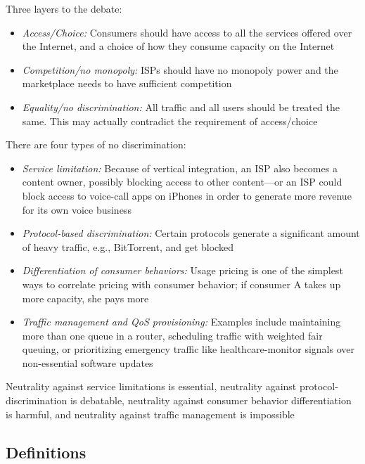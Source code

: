 \documentclass{article}
\begin{document}
Three layers to the debate:
\begin{itemize}
\item \textit{Access/Choice:} Consumers should have access to all the services offered over the Internet, and a choice of how they consume capacity on the Internet
\item \textit{Competition/no monopoly:} ISPs should have no monopoly power and the marketplace needs to have sufficient competition
\item \textit{Equality/no discrimination:} All traffic and all users should be treated the same. This may actually contradict the requirement of access/choice
\end{itemize}
There are four types of no discrimination:
\begin{itemize}
\item \textit{Service limitation:} Because of vertical integration, an ISP also becomes a content owner, possibly blocking access to other content---or an ISP could block access to voice-call apps on iPhones in order to generate more revenue for its own voice business
\item \textit{Protocol-based discrimination:} Certain protocols generate a significant amount of heavy traffic, e.g., BitTorrent, and get blocked
\item \textit{Differentiation of consumer behaviors:} Usage pricing is one of the simplest ways to correlate pricing with consumer behavior; if consumer A takes up more capacity, she pays more
\item \textit{Traffic management and QoS provisioning:} Examples include maintaining more than one queue in a router, scheduling traffic with weighted fair queuing, or prioritizing emergency traffic like healthcare-monitor signals over non-essential software updates
\end{itemize}
Neutrality against service limitations is essential, neutrality against protocol-discrimination is debatable, neutrality against consumer behavior differentiation is harmful, and neutrality against traffic management is impossible

\subsection{Definitions}
\end{document}
